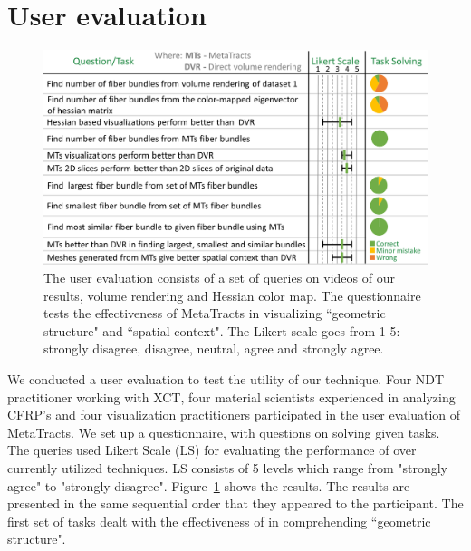 \section{User evaluation}\label{sec:user_eval}
\begin{figure}[tb]
	\centering
	\includegraphics[width=\linewidth,  trim = 0mm 00mm 0mm 0mm, clip]{images/usereval_AMA.eps}
	\caption{The user evaluation consists of a set of queries on videos of our results, volume rendering and Hessian color map. The questionnaire tests the effectiveness of MetaTracts in visualizing ``geometric structure" and ``spatial context". The Likert scale goes from 1-5: strongly disagree, disagree, neutral, agree and strongly agree. }
	\label{fig:userstudy}
\end{figure}
We conducted a user evaluation to test the utility of our technique. Four NDT practitioner working with XCT, four material scientists experienced in analyzing CFRP's and four visualization practitioners participated in the user evaluation of MetaTracts. We set up a questionnaire, with questions on solving given tasks. The queries used Likert Scale (LS) for evaluating the performance of \mt over currently utilized techniques. 
LS consists of 5 levels which range from "strongly agree" to "strongly disagree". Figure~\ref{fig:userstudy} shows the results. The results are presented in the same sequential order that they appeared to the participant. The first set of tasks dealt with the effectiveness of \mt in comprehending ``geometric structure".

